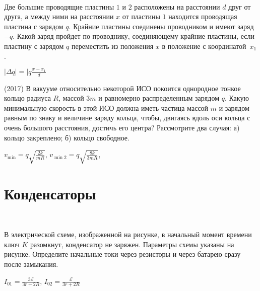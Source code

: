 \begin{ex}
\hspace{0pt} \\
\begin{minipage}{.65\textwidth}
Две большие проводящие пластины $1$ и $2$ расположены на расстоянии $d$ друг от друга, 
а между ними на расстоянии $x$ от пластины $1$ находится проводящая пластина с зарядом $q$. 
Крайние пластины соединены проводником и имеют заряд $-q$. 
Какой заряд пройдет по проводнику, соединяющему крайние пластины, если пластину с зарядом $q$ переместить из положения $x$ в положение с координатой~$x_1$.
\end{minipage}
\begin{minipage}{.35\textwidth}
\centering

\end{minipage}
\begin{ans}
$\mid\Delta q \mid = \mid q \frac{x-x_1}{d}$
\end{ans}
\end{ex}

\begin{ex}
(2017) В вакууме относительно некоторой ИСО покоится однородное тонкое кольцо радиуса $R$, массой $3m$ и равномерно распределенным зарядом $q$. Какую минимальную скорость в этой ИСО должна иметь частица массой $m$ и зарядом равным по знаку и величине заряду кольца, чтобы, двигаясь вдоль оси кольца с очень большого расстояния, достичь его центра? Рассмотрите два случая: а) кольцо закреплено; б) кольцо свободное.
\begin{ans}
$v_{\min} = q\sqrt{\frac{2k}{mR}}$, $v_{\min 2} = q\sqrt{\frac{8k}{3mR}}$, 
\end{ans}
\end{ex}

\section{Конденсаторы}

\begin{ex}
\hspace{0pt} \\
\begin{minipage}{.65\textwidth}
В электрической схеме, изображенной на рисунке, в начальный момент времени ключ $K$ разомкнут, конденсатор не заряжен. 
Параметры схемы указаны на рисунке. Определите начальные токи через резисторы и через батарею сразу после замыкания.
\end{minipage}
\begin{minipage}{.35\textwidth}
\centering

\end{minipage}
\begin{ans}
$I_{01} = \frac{3 \mathcal{E}}{3r+2R}$, $I_{02} = \frac{\mathcal{E}}{3r+2R}$
\end{ans}
\end{ex}

